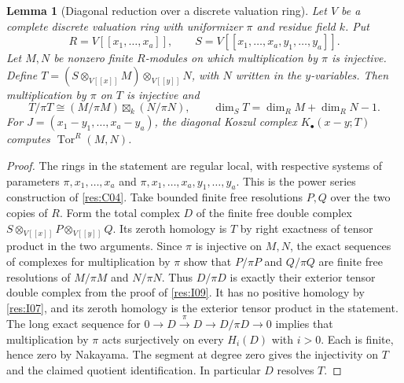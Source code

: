 \documentclass[11pt,oneside,openany]{book}
\newtheorem{lemma}[theorem]{Lemma}
\theoremstyle{definition}
\theoremstyle{remark}
\begin{document}
\begin{lemma}[Diagonal reduction over a discrete valuation ring]\label{res:I11}
Let \(V\) be a complete discrete valuation ring with uniformizer
\(\pi\) and residue field \(k\). Put
\[
 R=V[[x_1,\ldots,x_a]],\qquad
 S=V[[x_1,\ldots,x_a,y_1,\ldots,y_a]] .
\]
Let \(M,N\) be nonzero finite \(R\)-modules on which multiplication
by \(\pi\) is injective. Define \(T=(S\otimes_{V[[x]]}M)
\otimes_{V[[y]]}N\), with \(N\) written in the \(y\)-variables.
Then multiplication by \(\pi\) on \(T\) is injective and
\[
 T/\pi T\cong (M/\pi M)\boxtimes_k(N/\pi N),\qquad
 \dim_S T=\dim_R M+\dim_R N-1 .
\]
For \(J=(x_1-y_1,\ldots,x_a-y_a)\), the diagonal Koszul complex
\(K_\bullet(x-y;T)\) computes \(\operatorname{Tor}^R(M,N)\).
\end{lemma}
\begin{proof}
The rings in the statement are regular local, with respective
systems of parameters \(\pi,x_1,\ldots,x_a\) and
\(\pi,x_1,\ldots,x_a,y_1,\ldots,y_a\). This is the power series
construction of \ref{res:C04}. Take bounded finite free resolutions
\(P,Q\) over the two copies of \(R\). Form the total complex \(D\) of
the finite free double complex
\(S\otimes_{V[[x]]}P\otimes_{V[[y]]}Q\). Its zeroth homology is
\(T\) by right exactness of tensor product in the two arguments.
Since \(\pi\) is injective on \(M,N\), the exact sequences of
complexes for multiplication by \(\pi\) show that \(P/\pi P\)
and \(Q/\pi Q\) are finite free resolutions of \(M/\pi M\)
and \(N/\pi N\). Thus \(D/\pi D\) is exactly their exterior tensor
double complex from the proof of \ref{res:I09}.
It has no positive homology by \ref{res:I07}, and its zeroth
homology is the exterior tensor product in the statement.
The long exact sequence for
\(0\to D\xrightarrow{\pi}D\to D/\pi D\to0\) implies
that multiplication by \(\pi\) acts surjectively on every
\(H_i(D)\) with \(i>0\). Each is finite, hence zero by Nakayama.
The segment at degree zero gives the injectivity on \(T\)
and the claimed quotient identification. In particular \(D\)
resolves \(T\).


\end{proof}
\end{document}
